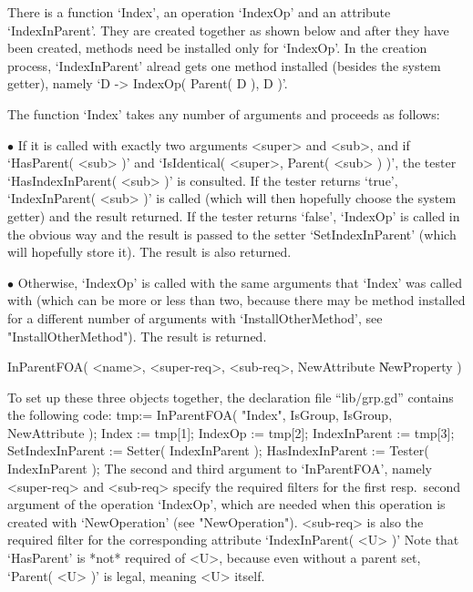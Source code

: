 There  is  a function  `Index', an operation   `IndexOp' and an attribute
`IndexInParent'. They are created together as  shown below and after they
have been  created, methods need be  installed only for `IndexOp'. In the
creation  process,  `IndexInParent'  alread   gets  one method  installed
(besides the system getter), namely `D -> IndexOp( Parent( D ), D )'.

The function  `Index' takes   any number of  arguments and    proceeds as
follows:
\beginlist
\item{$\bullet$}
  If it is called  with exactly two arguments  <super> and <sub>,  and if
  `HasParent( <sub> )' and `IsIdentical( <super>, Parent( <sub> ) )', the
  tester `HasIndexInParent( <sub> )' is consulted.
  \itemitem{$\circ$}
    If  the  tester returns `true',  `IndexInParent(  <sub> )'  is called
    (which  will then hopefully choose  the system getter) and the result
    returned.
  \itemitem{$\circ$}
    If the tester returns `false', `IndexOp' is called in the obvious way
    and the result is passed to the setter `SetIndexInParent' (which will
    hopefully store it). The result is also returned.
\item{$\bullet$}
  Otherwise, `IndexOp' is called with the same arguments that `Index' was
  called with (which can be more  or less than two,  because there may be
  method    installed for     a  different  number   of   arguments  with
  `InstallOtherMethod',    see  "InstallOtherMethod").   The  result   is
  returned.
\endlist

\>InParentFOA( <name>, <super-req>, <sub-req>, NewAttribute \| %
  NewProperty )

To  set  up  these   three    objects  together, the  declaration    file
``lib/grp.gd'' contains the following code:
\begintt
    tmp:= InParentFOA( "Index", IsGroup, IsGroup, NewAttribute );
    Index         := tmp[1];
    IndexOp       := tmp[2];
    IndexInParent := tmp[3];
    SetIndexInParent := Setter( IndexInParent );
    HasIndexInParent := Tester( IndexInParent );
\endtt
The  second and third argument to  `InParentFOA',  namely <super-req> and
<sub-req> specify  the required   filters  for the first    resp.\ second
argument of the operation `IndexOp', which are needed when this operation
is  created with `NewOperation' (see  "NewOperation").  <sub-req> is also
the  required filter for the  corresponding attribute `IndexInParent( <U>
)' Note that `HasParent' is *not* required of <U>, because even without a
parent set, `Parent( <U> )' is legal, meaning <U> itself.

